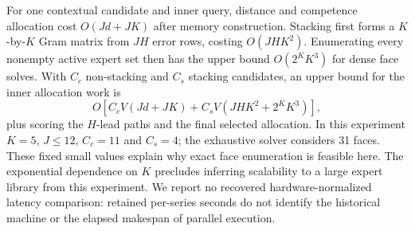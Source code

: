 For one contextual candidate and inner query, distance and competence allocation cost $O(Jd+JK)$ after memory construction. Stacking first forms a $K$-by-$K$ Gram matrix from $JH$ error rows, costing $O(JHK^2)$. Enumerating every nonempty active expert set then has the upper bound $O(2^K K^3)$ for dense face solves. With $C_c$ non-stacking and $C_s$ stacking candidates, an upper bound for the inner allocation work is
\begin{equation}
 O\!\left[C_cV(Jd+JK)+C_sV(JHK^2+2^KK^3)\right],
\end{equation}
plus scoring the $H$-lead paths and the final selected allocation. In this experiment $K=5$, $J\le12$, $C_c=11$ and $C_s=4$; the exhaustive solver considers 31 faces. These fixed small values explain why exact face enumeration is feasible here. The exponential dependence on $K$ precludes inferring scalability to a large expert library from this experiment. We report no recovered hardware-normalized latency comparison: retained per-series seconds do not identify the historical machine or the elapsed makespan of parallel execution.

